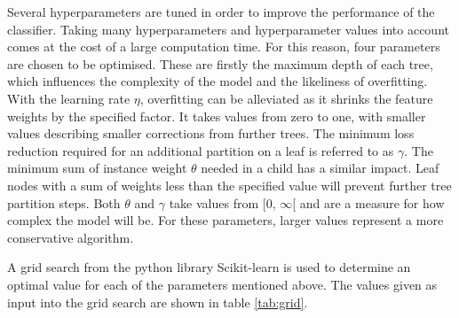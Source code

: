 Several hyperparameters are tuned in order to improve the performance of the classifier.
Taking many hyperparameters and hyperparameter values into account comes at the
cost of a large computation time. For this reason, four parameters are chosen to be optimised. These are firstly the maximum depth of each tree, which influences the
complexity of the model and the likeliness of overfitting. With the learning rate $\eta$, overfitting can be alleviated as it shrinks the feature weights
by the specified factor. It takes values from zero to one, with smaller values describing smaller corrections from further trees.
The minimum loss reduction required for an additional partition on a leaf is referred to as $\gamma$. The minimum sum of instance weight $\theta$
needed in a child has a similar impact. Leaf nodes with a sum of weights less than the specified value will prevent further tree partition steps.
Both $\theta$ and $\gamma$ take values from [0, $\infty$[ and are a measure for how complex the model will be.
For these parameters, larger values represent a more
conservative algorithm.

A grid search from the python \cite{python} library Scikit-learn \cite{scikit} is used to determine an optimal value for each of the parameters mentioned above. The values given as input into the grid search
are shown in table \ref{tab:grid}.

